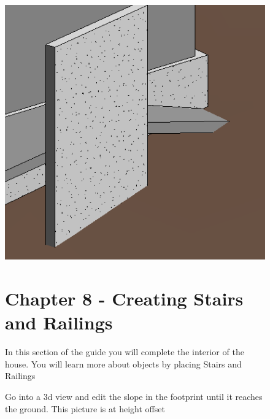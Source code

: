 \documentclass{tufte-book} %
\begin{document}
\begin{figure}
\begin{enumerate}
		\begin{marginfigure}
		\includegraphics[width=\linewidth]{revitentrydeckfinal.png}
		\caption[A Sloped Deck]{Go into a 3d view and edit the slope in the footprint until it reaches the ground. This picture is at  height offset}
		\end{marginfigure}
\end{enumerate}

%
%

\chapter{Chapter 8 - Creating Stairs and Railings}
\label{ch:8}
In this section of the guide you will complete the interior of the house. You will learn more about objects by placing Stairs and Railings
\begin{enumerate}



\end{enumerate}
\end{figure}
\end{document}
